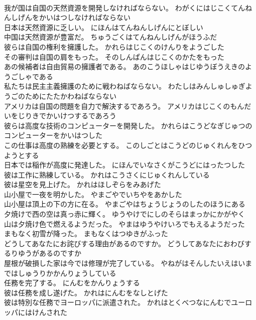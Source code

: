 \documentclass[8pt]{extreport}
\begin{document}
\begin{CJK}{UTF8}{min}
\\	我が国は自国の天然資源を開発しなければならない。	わがくにはじこくてんねんしげんをかいはつしなければならない 
\\	日本は天然資源に乏しい。	にほんはてんねんしげんにとぼしい 
\\	中国は天然資源が豊富だ。	ちゅうごくはてんねんしげんがほうふだ 
\\	彼らは自国の権利を擁護した。	かれらはじこくのけんりをようごした 
\\	その審判は自国の肩をもった。	そのしんぱんはじこくのかたをもった 
\\	あの候補者は自由貿易の擁護者である。	あのこうほしゃはじゆうぼうえきのようごしゃである 
\\	私たちは民主主義擁護のために戦わねばならない。	わたしはみんしゅしゅぎようごのためにたたかわねばならない 
\\	アメリカは自国の問題を自力で解決するであろう。	アメリカはじこくのもんだいをじりきでかいけつするであろう 
\\	彼らは高度な技術のコンピューターを開発した。	かれらはこうどなぎじゅつのコンピューターをかいはつした 
\\	この仕事は高度の熟練を必要とする。	このしごとはこうどのじゅくれんをひつようとする 
\\	日本では稲作が高度に発達した。	にほんでいなさくがこうどにはったつした 
\\	彼は工作に熟練している。	かれはこうさくにじゅくれんしている 
\\	彼は星空を見上げた。	かれはほしぞらをみあげた 
\\	山小屋で一夜を明かした。	やまごやでいちやをあかした 
\\	山小屋は頂上の下の方に在る。	やまごやはちょうじょうのしたのほうにある 
\\	夕焼けで西の空は真っ赤に輝く。	ゆうやけでにしのそらはまっかにかがやく 
\\	山は夕焼け色で燃えるようだった。	やまはゆうやけいろでもえるようだった 
\\	まもなく初雪が降った。	まもなくはつゆきがふった 
\\	どうしてあなたにお詫びする理由があるのですか。	どうしてあなたにおわびするりゆうがあるのですか 
\\	屋根が破損した家は今では修理が完了している。	やねがはそんしたいえはいまではしゅうりかかんりょうしている 
\\	任務を完了する。	にんむをかんりょうする 
\\	彼は任務を成し遂げた。	かれはにんむをなしとげた 
\\	彼は特別な任務でヨーロッパに派遣された。	かれはとくべつなにんむでユーロッパにはけんされた 

\end{CJK}
\end{document}
